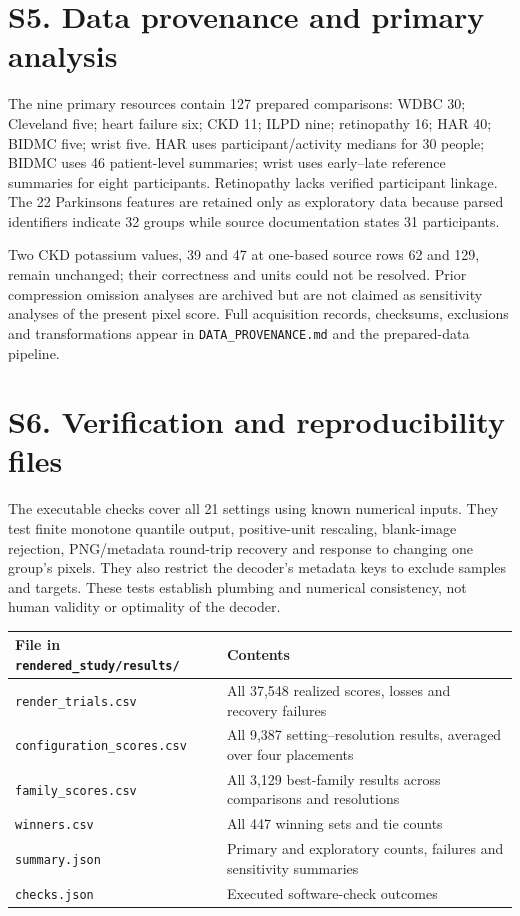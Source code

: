 \documentclass[10pt]{article}
\begin{document}
\section*{S5. Data provenance and primary analysis}
The nine primary resources contain 127 prepared comparisons: WDBC 30; Cleveland five; heart failure six; CKD 11; ILPD nine; retinopathy 16; HAR 40; BIDMC five; wrist five.\cite{wdbc,heart,failure,kidney,liver,retina,har,bidmc,wrist} HAR uses participant/activity medians for 30 people; BIDMC uses 46 patient-level summaries; wrist uses early--late reference summaries for eight participants.\cite{pimentel2017,jarchi2017} Retinopathy lacks verified participant linkage. The 22 Parkinsons features are retained only as exploratory data because parsed identifiers indicate 32 groups while source documentation states 31 participants.\cite{parkinsons}

Two CKD potassium values, 39 and 47 at one-based source rows 62 and 129, remain unchanged; their correctness and units could not be resolved. Prior compression omission analyses are archived but are not claimed as sensitivity analyses of the present pixel score. Full acquisition records, checksums, exclusions and transformations appear in \texttt{DATA\_PROVENANCE.md} and the prepared-data pipeline.

\section*{S6. Verification and reproducibility files}
The executable checks cover all 21 settings using known numerical inputs. They test finite monotone quantile output, positive-unit rescaling, blank-image rejection, PNG/metadata round-trip recovery and response to changing one group's pixels. They also restrict the decoder's metadata keys to exclude samples and targets. These tests establish plumbing and numerical consistency, not human validity or optimality of the decoder.

\begin{tabular}{p{6cm}p{9cm}}\toprule
File in \texttt{rendered\_study/results/} & Contents\\\midrule
\texttt{render\_trials.csv} & All 37,548 realized scores, losses and recovery failures\\
\texttt{configuration\_scores.csv} & All 9,387 setting--resolution results, averaged over four placements\\
\texttt{family\_scores.csv} & All 3,129 best-family results across comparisons and resolutions\\
\texttt{winners.csv} & All 447 winning sets and tie counts\\
\texttt{summary.json} & Primary and exploratory counts, failures and sensitivity summaries\\
\texttt{checks.json} & Executed software-check outcomes\\\bottomrule
\end{tabular}
\end{document}
